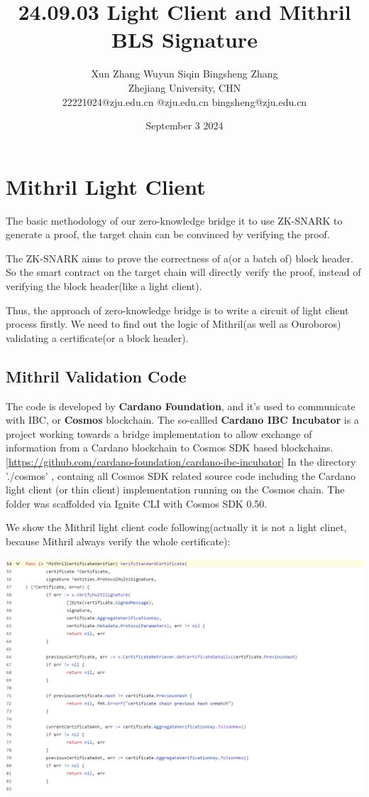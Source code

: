 \documentclass{article}
\title{24.09.03 Light Client and Mithril BLS Signature}
\author{Xun Zhang \quad \quad Wuyun Siqin \quad \quad Bingsheng Zhang \\ 
Zhejiang University, CHN \\
22221024@zju.edu.cn \quad 3210101763@zju.edu.cn \quad bingsheng@zju.edu.cn}
\date{September 3 2024}
\begin{document}
\maketitle

\section{Mithril Light Client}

The basic methodology of our zero-knowledge bridge it to use ZK-SNARK to generate a proof, the target chain can be convinced by verifying the proof.

The ZK-SNARK aims to prove the correctness of a(or a batch of) block header. So the smart contract on the target chain will directly verify the proof, instead of verifying the block header(like a light client).

Thus, the approach of zero-knowledge bridge is to write a circuit of light client process firstly. We need to find out the logic of Mithril(as well as Ouroboros) validating a certificate(or a block header).

\subsection{Mithril Validation Code}

The code is developed by \textbf{Cardano Foundation}, and it's used to communicate with IBC, or \textbf{Cosmos} blockchain. The so-callled \textbf{Cardano IBC Incubator} is a project working towards a bridge implementation to allow exchange of information from a Cardano blockchain to Cosmos SDK based blockchains.\href{https://github.com/cardano-foundation/cardano-ibc-incubator}{[https://github.com/cardano-foundation/cardano-ibc-incubator]}
In the directory './cosmos' , containg all Cosmos SDK related source code including the Cardano light client (or thin client) implementation running on the Cosmos chain. The folder was scaffolded via Ignite CLI with Cosmos SDK 0.50.

We show the Mithril light client code following(actually it is not a light clinet, because Mithril always verify the whole certificate):


\includegraphics[width=1\linewidth]{cardano-ibc-client-mithril-verifycertificate-1.png}
\end{document}
